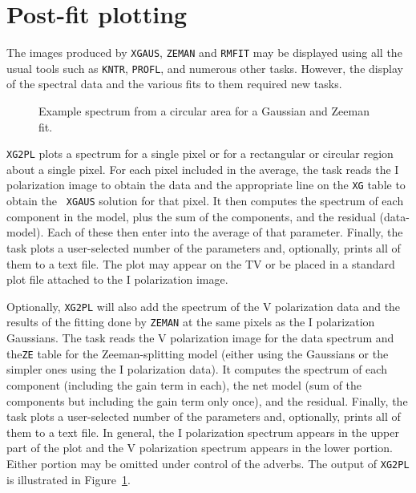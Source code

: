 \documentclass[twoside]{article}
\newcommand{\Hi}[1]{\textcolor{hicol}{#1}}
\newcommand{\hicol}{\color{hicol}}
\newcommand{\putfig}[1]{\texttt{[image: \#1.eps]}}
\begin{document}
\hicol
\section{Post-fit plotting}

The images produced by {\tt XGAUS}, {\tt ZEMAN} and {\tt RMFIT} may be
displayed using all the usual tools such as {\tt KNTR}, {\tt PROFL},
and numerous other tasks.  However, the display of the spectral data
and the various fits to them required new tasks.

\begin{figure}
\begin{center}
\resizebox{6.0in}{!}{\putfig{XG2PL}}
\caption{\Hi{Example spectrum from a circular area for a Gaussian and
  Zeeman fit.}}
\label{fig:XG2PL}
\end{center}
\end{figure}

{\tt XG2PL} plots a spectrum for a single pixel or for a rectangular
or circular region about a single pixel.  For each pixel included in
the average, the task reads the I polarization image to obtain the
data and the appropriate line on the {\tt XG} table to obtain the {\tt
  XGAUS} solution for that pixel.  It then computes the spectrum of
each component in the model, plus the sum of the components, and the
residual (data-model).  Each of these then enter into the average of
that parameter.  Finally, the task plots a user-selected number of the
parameters and, optionally, prints all of them to a text file.  The
plot may appear on the TV or be placed in a standard plot file
attached to the I polarization image.

Optionally, {\tt XG2PL} will also add the spectrum of the V
polarization data and the results of the fitting done by {\tt ZEMAN}
at the same pixels as the I polarization Gaussians.  The task reads
the V polarization image for the data spectrum and the{\tt ZE} table
for the Zeeman-splitting model (either using the Gaussians or the
simpler ones using the I polarization data).  It computes the spectrum
of each component (including the gain term in each), the net model
(sum of the components but including the gain term only once), and the
residual.  Finally, the task plots a user-selected number of the
parameters and, optionally, prints all of them to a text file.  In
general, the I polarization spectrum appears in the upper part of the
plot and the V polarization spectrum appears in the lower portion.
Either portion may be omitted under control of the adverbs.  The
output of {\tt XG2PL} is illustrated in Figure~\ref{fig:XG2PL}.
\end{document}
